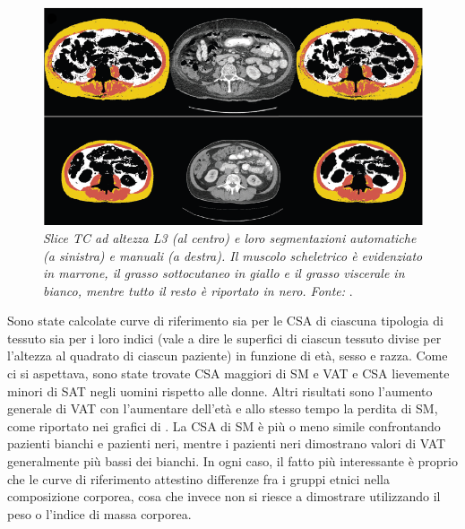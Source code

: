 \begin{figure}[t]
\centering
\includegraphics[scale=0.99]{Immagini/magudia_segmentazione.png}
\caption{\label{fig:magudia_segmentazione} \textit{Slice TC ad altezza L3 (al centro) e loro segmentazioni automatiche (a sinistra) e manuali (a destra). Il muscolo scheletrico è evidenziato in marrone, il grasso sottocutaneo in giallo e il grasso viscerale in bianco, mentre tutto il resto è riportato in nero. Fonte:} \cite{Magudia2021}.}
\end{figure}
Sono state calcolate curve di riferimento sia per le CSA di ciascuna tipologia di tessuto sia per i loro indici (vale a dire le superfici di ciascun tessuto divise per l’altezza al quadrato di ciascun paziente) in funzione di età, sesso e razza. Come ci si aspettava, sono state trovate CSA maggiori di SM e VAT e CSA lievemente minori di SAT negli uomini rispetto alle donne. Altri risultati sono l’aumento generale di VAT con l’aumentare dell'età e allo stesso tempo la perdita di SM, come riportato nei grafici di . La CSA di SM è più o meno simile confrontando pazienti bianchi e pazienti neri, mentre i pazienti neri dimostrano valori di VAT generalmente più bassi dei bianchi. In ogni caso, il fatto più interessante è proprio che le curve di riferimento attestino differenze fra i gruppi etnici nella composizione corporea, cosa che invece non si riesce a dimostrare utilizzando il peso o l’indice di massa corporea.
